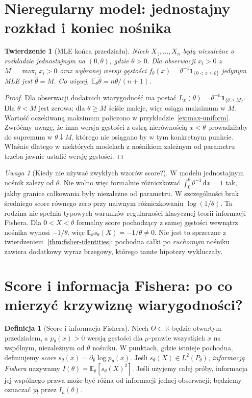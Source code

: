 \documentclass[11pt,a4paper,oneside]{report}
\numberwithin{equation}{chapter}
\theoremstyle{plain}
\newtheorem{twierdzenie}{Twierdzenie}[chapter]
\theoremstyle{definition}
\newtheorem{definicja}{Definicja}[chapter]
\theoremstyle{remark}
\newtheorem{uwaga}{Uwaga}[chapter]
\newcommand{\R}{\mathbb R}
\newcommand{\E}{\mathbb E}
\newcommand{\ind}[1]{\mathbf 1_{#1}}
\newcommand{\dd}{\mathrm d}
\begin{document}
\section{Nieregularny model: jednostajny rozkład i koniec nośnika}
\begin{twierdzenie}[MLE końca przedziału]\label{thm:mle-uniform}
Niech $X_1,\ldots,X_n$ będą niezależne o rozkładzie jednostajnym na
$(0,\theta)$, gdzie $\theta>0$. Dla obserwacji $x_i>0$ z
$M=\max_i x_i>0$ oraz wybranej wersji gęstości
$f_\theta(x)=\theta^{-1}\ind{\{0<x\le\theta\}}$ jedynym MLE jest
$\widehat\theta=M$. Co więcej, $\E_\theta\widehat\theta=n\theta/(n+1)$.
\end{twierdzenie}
\begin{proof}
Dla obserwacji dodatnich wiarygodność ma postać
$L_x(\theta)=\theta^{-n}\ind{\{\theta\ge M\}}$.
Dla $\theta<M$ jest zerowa; dla $\theta\ge M$ ściśle maleje, więc
osiąga maksimum w $M$. Wartość oczekiwaną maksimum policzono
w przykładzie~\ref{ex:max-uniform}. Zwróćmy uwagę, że inna wersja
gęstości z ostrą nierównością $x<\theta$ prowadziłaby do supremum
w $\theta\downarrow M$, którego nie osiągano by w tym konkretnym punkcie.
Właśnie dlatego w niektórych modelach z nośnikiem zależnym od parametru
trzeba jawnie ustalić wersję gęstości.
\end{proof}

\begin{uwaga}[Kiedy nie używać zwykłych wzorów score?]
W modelu jednostajnym nośnik zależy od $\theta$. Nie wolno więc
formalnie różniczkować $\int_0^\theta\theta^{-1}\,\dd x=1$
tak, jakby granice całkowania były niezależne od parametru.
W szczególności brak średniego score równego zero przy naiwnym
różniczkowaniu $\log(1/\theta)$. Ta rodzina nie spełnia typowych
warunków regularności klasycznej teorii informacji Fishera.
Dla $0<X<\theta$ formalny score pochodzący z samej gęstości
wewnątrz nośnika wynosi $-1/\theta$, więc
$\E_\theta s_\theta(X)=-1/\theta\ne0$.
Nie jest to sprzeczne z twierdzeniem~\ref{thm:fisher-identities}:
pochodna całki po \emph{ruchomym} nośniku zawiera dodatkowy wyraz
brzegowy, którego tamte hipotezy wykluczały.
\end{uwaga}

\section{Score i informacja Fishera: po co mierzyć krzywiznę wiarygodności?}
\begin{definicja}[Score i informacja Fishera]\label{def:score-fisher}
Niech $\Theta\subset\R$ będzie otwartym przedziałem, a $p_\theta(x)>0$
wersją gęstości dla $\mu$-prawie wszystkich $x$ na wspólnym, niezależnym od
$\theta$ nośniku. W punktach, gdzie istnieje pochodna, definiujemy
\emph{score} $s_\theta(x)=\partial_\theta\log p_\theta(x)$.
Jeśli $s_\theta(X)\in L^2(P_\theta)$, \emph{informacją Fishera} nazywamy
$I(\theta)=\E_\theta[s_\theta(X)^2]$.
Jeśli użyjemy całej próby, informacja jej wspólnego prawa może być różna
od informacji jednej obserwacji; będziemy oznaczać ją przez $I_n(\theta)$.
\end{definicja}
\end{document}
